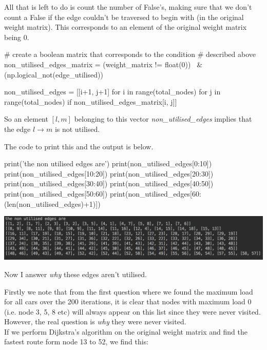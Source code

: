\documentclass[paper=a4, fontsize=12pt]{scrartcl} %
\numberwithin{equation}{section}       %
\numberwithin{figure}{section}         %
\numberwithin{table}{section}          %
\begin{document}
All that is left to do is count the number of False's, making sure that we don't count a False if the edge couldn't be traversed to begin with (in the original weight matrix). This corresponds to an element of the original weight matrix being 0.

\begin{python}
# create a boolean matrix that corresponds to the condition
# described above
non_utilised_edges_matrix = (weight_matrix != float(0)) \
                                & (np.logical_not(edge_utilised))
                                
non_utilised_edges = [[i+1, j+1] for i in range(total_nodes)
                          for j in range(total_nodes)
                          if non_utilised_edges_matrix[i, j]]

\end{python}

So an element $[l,m]$ belonging to this vector \textit{non\_utilised\_edges} implies that the edge $l \to m$ is not utilised.

The code to print this and the output is below.

\begin{python}
print('the non utilised edges are')
print(non_utilised_edges[0:10])
print(non_utilised_edges[10:20])
print(non_utilised_edges[20:30])
print(non_utilised_edges[30:40])
print(non_utilised_edges[40:50])
print(non_utilised_edges[50:60])
print(non_utilised_edges[60:(len(non_utilised_edges)+1)])
\end{python}

\includegraphics[scale=0.65]{non_utilised_edges}

Now I answer \textit{why} these edges aren't utilised. 

Firstly we note that from the first question where we found the maximum load for all cars over the 200 iterations, it is clear that nodes with maximum load 0 (i.e. node 3, 5, 8 etc) will always appear on this list since they were never visited. However, the real question is \textit{why} they were never visited. \\

If we perform Dijkstra's algorithm on the original weight matrix and find the fastest route form node 13 to 52, we find this:
\end{document}
